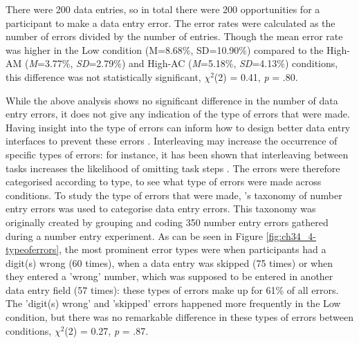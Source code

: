 There were 200 data entries, so in total there were 200 opportunities for a participant to make a data entry error. The error rates were calculated as the number of errors divided by the number of entries. Though the mean error rate was higher in the Low condition (M=8.68\%, SD=10.90\%) compared to the High-AM (\textit{M}=3.77\%, \textit{SD}=2.79\%) and High-AC (\textit{M}=5.18\%, \textit{SD}=4.13\%) conditions, this difference was not statistically significant, $\chi^2$(2) = 0.41, \textit{p} = .80. 


While the above analysis shows no significant difference in the number of data entry errors, it does not give any indication of the type of errors that were made. Having insight into the type of errors can inform how to design better data entry interfaces to prevent these errors \citep{Wiseman2011}. Interleaving may increase the occurrence of specific types of errors: for instance, it has been shown that interleaving between tasks increases the likelihood of omitting task steps \citep{Back2012}. %
The errors were therefore categorised according to type, to see what type of errors were made across conditions. To study the type of errors that were made, \citeauthor{Wiseman2011}'s \citeyearpar{Wiseman2011} taxonomy of number entry errors was used to categorise data entry errors. This taxonomy was originally created by grouping and coding 350 number entry errors gathered during a number entry experiment. As can be seen in Figure \ref{fig:ch34_4-typeoferrors}, the most prominent error types were when participants had a digit(s) wrong (60 times), when a data entry was skipped (75 times) or when they entered a 'wrong' number, which was supposed to be entered in another data entry field (57 times): these types of errors make up for 61\% of all errors. The 'digit(s) wrong' and 'skipped' errors happened more frequently in the Low condition, but there was no remarkable difference in these types of errors between conditions,  $\chi^2$(2) = 0.27, \textit{p} = .87. 


